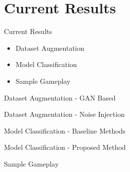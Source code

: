 \section{Current Results}
\begin{frame}{Current Results}
    \begin{itemize}
        \item Dataset Augmentation
        \item Model Classification
        \item Sample Gameplay
    \end{itemize}
\end{frame}

\begin{frame}{Dataset Augmentation - GAN Based}
    \begin{figure}[htpb!]
        \centering
    \end{figure}
\end{frame}

\begin{frame}{Dataset Augmentation - Noise Injection}
    \begin{figure}[htpb!]
        \centering
    \end{figure}
\end{frame}

\begin{frame}{Model Classification - Baseline Methods}
    \begin{figure}[htpb!]
        \centering
    \end{figure}
\end{frame}

\begin{frame}{Model Classification - Proposed Method}
    \begin{figure}[htpb!]
        \centering
    \end{figure}
\end{frame}

\begin{frame}{Sample Gameplay}
    \begin{figure}[htpb!]
        \centering
        \href{https://www.youtube.com}{%
        }
    \end{figure}
\end{frame}
